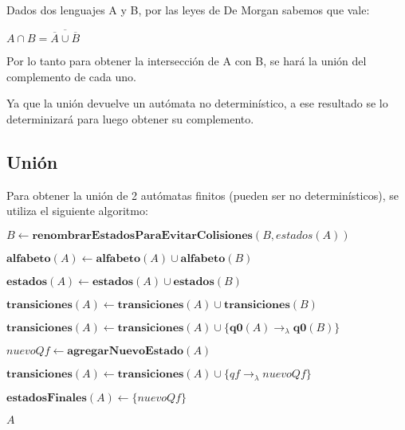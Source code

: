 Dados dos lenguajes A y B, por las leyes de De Morgan sabemos que vale:

$A \cap B = \overline{\overline{A} \cup \overline{B}}$

Por lo tanto para obtener la intersección de A con B, se hará la unión del complemento de cada uno.

Ya que la unión devuelve un autómata no determinístico, a ese resultado se lo determinizará para luego obtener su complemento.

\subsection{Unión}

Para obtener la unión de 2 autómatas finitos (pueden ser no determinísticos), se utiliza el siguiente algoritmo:

\begin{algorithm}
\begin{algorithmic}[1]

    \State $B \gets \textbf{renombrarEstadosParaEvitarColisiones}(B, estados(A)) $

    \State $\textbf{alfabeto}(A) \gets \textbf{alfabeto}(A) \cup \textbf{alfabeto}(B)$

    \State $\textbf{estados}(A) \gets \textbf{estados}(A) \cup \textbf{estados}(B)$

    \State $\textbf{transiciones}(A) \gets \textbf{transiciones}(A) \cup \textbf{transiciones}(B)$

    \State $\textbf{transiciones}(A) \gets \textbf{transiciones}(A) \cup \{\textbf{q0}(A) \rightarrow_{\lambda} \textbf{q0}(B)\}$

    \State $nuevoQf \gets \textbf{agregarNuevoEstado}(A)$


      \State $\textbf{transiciones}(A) \gets \textbf{transiciones}(A) \cup \{qf \rightarrow_{\lambda} nuevoQf\}$
    \EndFor

    \State $\textbf{estadosFinales}(A) \gets \{nuevoQf\}$

    \State \Return $A$
  \EndFunction
\end{algorithmic}
\end{algorithm}
